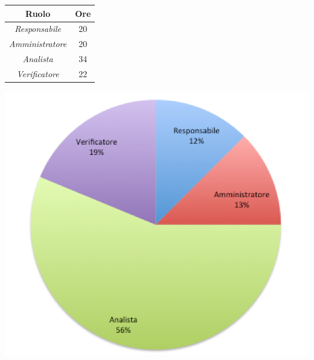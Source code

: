 \begin{center}
  \centering
  \begin{tabular}{|c|c|}
    \hline
    \textbf{Ruolo} & \textbf{Ore} \\
    \hline
     \emph{Responsabile}  & 20 \\
    \hline  \emph{Amministratore}  & 20 \\
    \hline  \emph{Analista}  & 34 \\
    \hline  \emph{Verificatore}  & 22 \\
    \hline
  \end{tabular}
  \includegraphics[scale=0.7]{img/grafico2.png}
\end{center}



